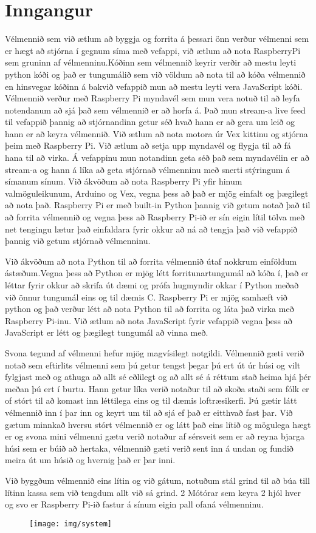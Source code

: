 \section{Inngangur}
Vélmennið sem við ætlum að byggja og forrita á þessari önn verður vélmenni sem er hægt að stjórna í gegnum síma með vefappi, við ætlum að nota RaspberryPi sem gruninn af vélmenninu.Kóðinn sem vélmennið keyrir verðir að mestu leyti python kóði og það er tungumálið sem við völdum að nota til að kóða vélmennið en hinsvegar kóðinn á bakvið vefappið mun að mestu leyti vera JavaScript kóði. Vélmennið verður með Raspberry Pi myndavél sem mun vera notuð til að leyfa notendanum að sjá það sem vélmennið er að horfa á. Það mun stream-a live feed til vefappið þannig að stjórnandinn getur séð hvað hann er að gera um leið og hann er að keyra vélmennið. Við ætlum að nota motora úr Vex kittinu og stjórna þeim með Raspberry Pi. Við ætlum að setja upp myndavél og flygja \cite{prasad2014smart} til að fá hana til að virka. Á vefappinu mun notandinn geta séð það sem myndavélin er að stream-a og hann á líka að geta stjórnað vélmenninu með snerti stýringum á símanum sínum. Við ákvöðum að nota Raspberry Pi yfir hinum valmöguleikunum, Arduino og Vex, vegna þess að það er mjög einfalt og þægilegt að nota það. Raspberry Pi er með built-in Python þannig við getum notað það til að forrita vélmennið og vegna þess að Raspberry Pi-ið er sín eigin lítil tölva með net tengingu lætur það einfaldara fyrir okkur að ná að tengja það við vefappið þannig við getum stjórnað vélmenninu.

Við ákvöðum að nota Python til að forrita vélmennið útaf nokkrum einföldum ástæðum.Vegna þess að Python er mjög létt forritunartungumál að kóða í, það er léttar fyrir okkur að skrifa út dæmi og prófa hugmyndir okkar í Python meðað við önnur tungumál eins og til dæmis C. Raspberry Pi er mjög samhæft við python og það verður létt að nota Python til að forrita og láta það virka með Raspberry Pi-inu. Við ætlum að nota JavaScript fyrir vefappið vegna þess að JavaScript er létt og þægilegt tungumál að vinna með.

Svona tegund af vélmenni hefur mjög magvísilegt notgildi. Vélmennið gæti verið notað sem eftirlits vélmenni sem þú getur tengst þegar þú ert út úr húsi og vilt fylgjast með og athuga að allt sé eðlilegt og að allt sé á réttum stað heima hjá þér meðan þú ert í burtu. Hann getur líka verið notaður til að skoða staði sem fólk er of stórt til að komast inn léttilega eins og til dæmis loftræsikerfi. Þú gætir látt vélmennið inn í þar inn og keyrt um til að sjá ef það er eitthvað fast þar. Við gætum minnkað hversu stórt vélmennið er og látt það eins lítið og mögulega hægt er og svona mini vélmenni gætu verið notaður af sérsveit sem er að reyna bjarga húsi sem er búið að hertaka, vélmennið gæti verið sent inn á undan og fundið meira út um húsið og hvernig það er þar inni. 

Við byggðum vélmennið eins lítin og við gátum, notuðum stál grind til að búa till lítinn kassa sem við tengdum allt við sá grind. 2 Mótórar sem keyra 2 hjól hver og svo er Raspberry Pi-ið fastur á sínum eigin pall ofaná vélmenninu.

\begin{figure}[h]
\texttt{[image: img/system]}
\end{figure}